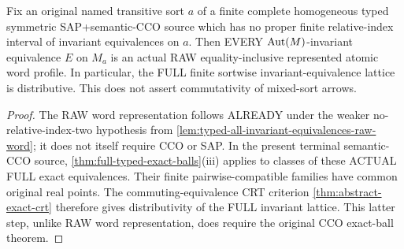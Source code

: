 \begin{lemma}
\label{lem:typed-terminal-all-equivalences-exact}
Fix an original named transitive sort $a$ of a finite
complete homogeneous typed symmetric SAP+semantic-CCO
source which has no proper finite relative-index interval
of invariant equivalences on $a$. Then EVERY
$\operatorname{Aut}(M)$-invariant equivalence $E$ on $M_a$
is an actual RAW equality-inclusive represented
atomic word profile. In particular, the FULL finite
sortwise invariant-equivalence lattice is distributive.
This does not assert commutativity of mixed-sort arrows.
\end{lemma}
\begin{proof}
The RAW word representation follows ALREADY under
the weaker no-relative-index-two hypothesis
from \cref{lem:typed-all-invariant-equivalences-raw-word};
it does not itself require CCO or SAP.
In the present terminal semantic-CCO source,
\cref{thm:full-typed-exact-balls}(iii) applies
to classes of these ACTUAL FULL exact
equivalences. Their finite pairwise-compatible
families have common original real points.
The commuting-equivalence CRT criterion
\cref{thm:abstract-exact-crt} therefore gives
distributivity of the FULL invariant lattice.
This latter step, unlike RAW word representation,
does require the original CCO exact-ball theorem.
\end{proof}
